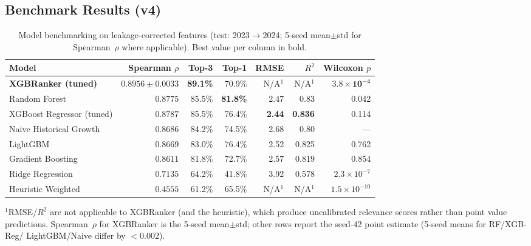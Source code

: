 \documentclass[conference]{IEEEtran}
\newcommand{\arrowto}{$\rightarrow$}
\begin{document}
\subsection{Benchmark Results (v4)}
\label{sub:benchv4}
\begin{table}[t]
\centering
\caption{Model benchmarking on leakage-corrected features (test:
2023\arrowto 2024; 5-seed mean$\pm$std for Spearman~$\rho$ where
applicable). Best value per column in bold.}
\label{tab:bench}
\begin{tabular}{@{}lrrrrrr@{}}
\toprule
\textbf{Model} & \textbf{Spearman $\rho$} & \textbf{Top-3} & \textbf{Top-1}
& \textbf{RMSE} & \textbf{$R^2$} & \textbf{Wilcoxon $p$} \\
\midrule
\textbf{XGBRanker (tuned)}   & $\mathbf{0.8956 \pm 0.0033}$ & \textbf{89.1\%} & 70.9\% & N/A$^{1}$ & N/A$^{1}$ & $\mathbf{3.8\times10^{-4}}$ \\
Random Forest                & $0.8775$ & 85.5\% & \textbf{81.8\%} & 2.47 & 0.83 & 0.042 \\
XGBoost Regressor (tuned)    & $0.8787$ & 85.5\% & 76.4\% & \textbf{2.44} & \textbf{0.836} & 0.114 \\
Naive Historical Growth      & $0.8686$ & 84.2\% & 74.5\% & 2.68 & 0.80 & --- \\
LightGBM                     & $0.8669$ & 83.0\% & 76.4\% & 2.52 & 0.825 & 0.762 \\
Gradient Boosting            & $0.8611$ & 81.8\% & 72.7\% & 2.57 & 0.819 & 0.854 \\
Ridge Regression             & $0.7135$ & 64.2\% & 41.8\% & 3.92 & 0.578 & $2.3\times10^{-7}$ \\
Heuristic Weighted           & $0.4555$ & 61.2\% & 65.5\% & N/A$^{1}$ & N/A$^{1}$ & $1.5\times10^{-10}$ \\
\bottomrule
\end{tabular}

\vspace{2pt}
{\footnotesize $^{1}$RMSE/$R^2$ are not applicable to XGBRanker (and the
heuristic), which produce uncalibrated relevance scores rather than point
value predictions. Spearman~$\rho$ for XGBRanker is the 5-seed mean$\pm$std;
other rows report the seed-42 point estimate (5-seed means for RF/XGB-Reg/
LightGBM/Naive differ by $<0.002$).}
\end{table}
\end{document}

